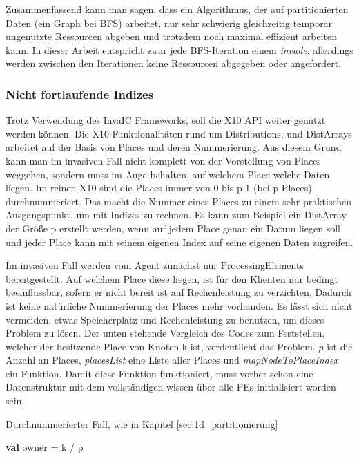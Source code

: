 Zusammenfassend kann man sagen, dass ein Algorithmus, der auf partitionierten Daten (ein Graph bei BFS) arbeitet, nur sehr schwierig gleichzeitig temporär ungenutzte Ressourcen abgeben und trotzdem noch maximal effizient arbeiten kann. In dieser Arbeit entspricht zwar jede BFS-Iteration einem \textit{invade}, allerdings werden zwischen den Iterationen keine Ressourcen abgegeben oder angefordert.

\subsubsection{Nicht fortlaufende Indizes} %
\label{ssub:nicht_fortlaufende_indizes}
Trotz Verwendung des InvaIC Frameworks, soll die X10 API weiter genutzt werden können. Die X10-Funktionalitäten rund um Distributions, und DistArrays arbeitet auf der Basis von Places und deren Nummerierung. Aus diesem Grund kann man im invasiven Fall nicht komplett von der Vorstellung von Places weggehen, sondern muss im Auge behalten, auf welchem Place welche Daten liegen. Im reinen X10 sind die Places immer von 0 bis p-1 (bei p Places) durchnummeriert. Das macht die Nummer eines Places zu einem sehr praktischen Ausgangspunkt, um mit Indizes zu rechnen. Es kann zum Beispiel ein DistArray der Größe p erstellt werden, wenn auf jedem Place genau ein Datum liegen soll und jeder Place kann mit seinem eigenen Index auf seine eigenen Daten zugreifen.

Im invasiven Fall werden vom Agent zunächst nur ProcessingElements bereitgestellt. Auf welchem Place diese liegen, ist für den Klienten nur bedingt beeinflussbar, sofern er nicht bereit ist auf Rechenleistung zu verzichten. Dadurch ist keine natürliche Nummerierung der Places mehr vorhanden. Es lässt sich nicht vermeiden, etwas Speicherplatz und Rechenleistung zu benutzen, um dieses Problem zu lösen. Der unten stehende Vergleich des Codes zum Feststellen, welcher der besitzende Place von Knoten k ist, verdeutlicht das Problem. $p$ ist die Anzahl an Places, \textit{placesList} eine Liste aller Places und \textit{mapNodeToPlaceIndex} ein Funktion. Damit diese Funktion funktioniert, muss vorher schon eine Datenstruktur mit dem vollständigen wissen über alle PEs initialisiert worden sein.
\begin{algorithm}
	\caption{Durchnummerierter Fall, wie in Kapitel \ref{sec:1d_partitionierung}}
	\label{alg:owner_consecutive}
	\begin{algorithmic}[1]
		\State \textbf{val} owner = k / p
	\end{algorithmic}
\end{algorithm}

